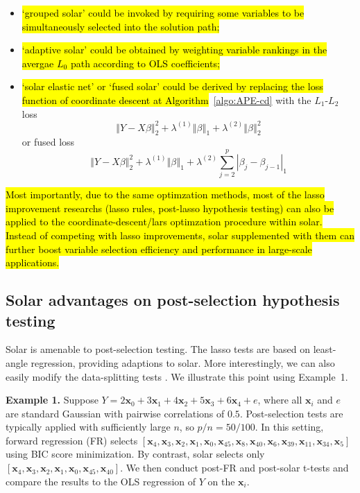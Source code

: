 \documentclass[12pt]{article}
\begin{document}
\begin{itemize}
  \item \hl{`grouped solar' could be invoked by requiring some variables to be simultaneously selected into the solution path;} 
  \item \hl{`adaptive solar' could be obtained by weighting variable rankings in the avergae $L_0$ path according to OLS coefficients;}
  \item \hl{`solar elastic net' or `fused solar' could be derived by replacing the loss function of coordinate descent at Algorithm}~\ref{algo:APE-cd} with the $L_1$-$L_2$ loss 
    \begin{equation}
      \left\Vert Y -X\beta \right\Vert_2^2 + \lambda^{(1)} \left\Vert \beta \right\Vert_1 + \lambda^{(2)} \left\Vert \beta \right\Vert_2^2
    \end{equation}
  or fused loss
    \begin{equation}
      \left\Vert Y -X\beta \right\Vert_2^2 + \lambda^{(1)} \left\Vert \beta \right\Vert_1 + \lambda^{(2)} \sum_{j=2}^{p} \left\vert \beta_j - \beta_{j-1} \right\vert_1
    \end{equation}
\end{itemize}

\hl{Most importantly, due to the same optimzation methods, most of the lasso improvement researchs (lasso rules, post-lasso hypothesis testing) can also be applied to the coordinate-descent/lars optimzation procedure within solar. Instead of competing with lasso improvements, solar supplemented with them can further boost variable selection efficiency and performance in large-scale applications.}

\subsection{Solar advantages on post-selection hypothesis testing}

Solar is amenable to post-selection testing. The lasso tests \citep{lockhartall14, taylor2014exact} are based on least-angle regression, providing adaptions to solar. More interestingly, we can also easily modify the data-splitting tests \citep{wasserman2009high,meinshausen2009p}. We illustrate this point using Example~1.

\smallskip
\noindent
\textbf{Example 1.} Suppose $Y = 2 \mathbf{x}_0 + 3 \mathbf{x}_1 + 4 \mathbf{x}_2 + 5 \mathbf{x}_3 + 6 \mathbf{x}_4  + e$, where all $\mathbf{x}_i$ and $e$ are standard Gaussian with pairwise correlations of $0.5$. Post-selection tests are typically applied with sufficiently large $n$, so $p/n=50/100$. In this setting, forward regression (FR) selects $\left[\mathbf{x}_4, \mathbf{x}_3, \mathbf{x}_2, \mathbf{x}_1, \mathbf{x}_0, \mathbf{x}_{45}, \mathbf{x}_{8}, \mathbf{x}_{40}, \mathbf{x}_{6}, \mathbf{x}_{39}, \mathbf{x}_{11}, \mathbf{x}_{34}, \mathbf{x}_{5} \right]$ using BIC score minimization. By contrast, solar selects only $\left[\mathbf{x}_4, \mathbf{x}_3, \mathbf{x}_2, \mathbf{x}_1, \mathbf{x}_0, \mathbf{x}_{45}, \mathbf{x}_{40} \right]$. We then conduct post-FR and post-solar t-tests and compare the results to the OLS regression of $Y$ on the $\mathbf{x}_i$.
\end{document}
